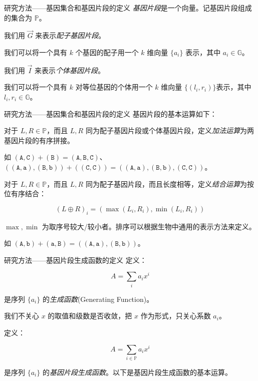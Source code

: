 \documentclass[10pt,aspectratio=43,mathserif]{ctexbeamer}
\begin{document}
	\begin{frame}{研究方法——基因集合和基因片段的定义}
		\textsl{基因片段}是一个向量。记基因片段组成的集合为 $\mathbb{P}$。
		
		我们用 $\vec G$ 来表示\textsl{配子基因片段}。
		
		我们可以将一个具有 $k$ 个基因的配子用一个 $k$ 维向量 $\{a_i\}$ 表示，其中 $a_i \in \mathbb{G}$。
		
		我们用 $\vec I$ 来表示\textsl{个体基因片段}。
		
		我们可以将一个具有 $k$ 对等位基因的个体用一个 $k$ 维向量 $\{(l_i,r_i)\}$表示，其中 $l_i,r_i \in \mathbb{G}$。
	\end{frame}

	\begin{frame}{研究方法——基因集合和基因片段的定义}
		基因片段的基本运算如下：
		
		对于 $L,R \in \mathbb{P}$，而且 $L,R$ 同为配子基因片段或个体基因片段，定义\textsl{加法运算}为两基因片段的有序拼接。
		
		如 $(\texttt{A},\texttt{C}) + (\texttt{B}) = (\texttt{A},\texttt{B},\texttt{C})$、$((\texttt{A},\texttt{a}),(\texttt{B},\texttt{b}))+((\texttt{C},\texttt{C}))=((\texttt{A},\texttt{a}),(\texttt{B},\texttt{b}),(\texttt{C},\texttt{C}))$。
		
		对于 $L,R \in \mathbb{P}$，而且 $L,R$ 同为配子基因片段，而且长度相等，定义\textsl{结合运算}为按位有序结合：
		
		$$(L \oplus R)_i=(\max(L_i,R_i),\min(L_i,R_i))$$
		
		$\max,\min$ 为取序号较大/较小者。排序可以根据生物中通用的表示方法来定义。
		
		如 $(\texttt{A},\texttt{b}) + (\texttt{a},\texttt{B})=((\texttt{A},\texttt{a}),(\texttt{B},\texttt{b}))$。
	\end{frame}

	\begin{frame}{研究方法——基因片段生成函数的定义}
		定义：
		
		$$A=\sum_{i} a_i x^{i}$$
		
		是序列 $\{a_i\}$ 的\textsl{生成函数}(Generating Function)。
		
		我们不关心 $x$ 的取值和级数是否收敛，把 $x$ 作为形式，只关心系数 $a_i$。
		
		定义：
		
		$$A=\sum_{i \in \mathbb{P}} a_i x^{i}$$
		
		是序列 $\{a_i\}$ 的\textsl{基因片段生成函数}。以下是基因片段生成函数的基本运算。
	\end{frame}
\end{document}
